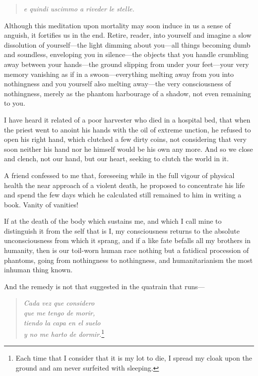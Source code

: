 \begin{quote} \textit{e quindi uscimmo a riveder le stelle.}
\end{quote}

Although this meditation upon mortality may soon induce in us a sense
of anguish, it fortifies us in the end. Retire, reader, into yourself
and imagine a slow dissolution of your\-self---the light dimming about
you---all things becoming dumb and soundless, enveloping you in
silence---the objects that you handle crumbling away between your
hands---the ground slipping from under your feet---your very memory
vanishing as if in a swoon---eve\-ry\-thing melting away from you into
nothingness and you yourself also melting a\-way---the very
consciousness of nothingness, merely as the phantom harbourage of a
shadow, not even remaining to you.

I have heard it related of a poor harvester who died in a hospital
bed, that when the priest went to anoint his hands with the oil of
extreme unction, he refused to open his right hand, which clutched a
few dirty coins, not considering that very soon neither his hand nor
he himself would be his own any more. And so we close and clench, not
our hand, but our heart, seeking to clutch the world in it.

A friend confessed to me that, foreseeing while in the full vigour of
physical health the near approach of a violent death, he proposed to
concentrate his life and spend the few days which he calculated still
remained to him in writing a book. Vanity of vanities!

If at the death of the body which sustains me, and which I call mine
to distinguish it from the self that is I, my consciousness returns to
the absolute unconsciousness from which it sprang, and if a like fate
befalls all my brothers in humanity, then is our toil-worn human race
nothing but a fatidical procession of phantoms, going from nothingness
to nothingness, and humanitarianism the most inhuman thing known.

And the remedy is not that suggested in the quatrain that
runs---

\begin{verse}
\textit{Cada vez que considero\\
que me tengo de morir,\\
tiendo la capa en el suelo\\
y no me harto de dormir.}\footnote{Each time that I
consider that it is my lot to die, I spread my cloak upon the ground
and am never surfeited with sleeping.}
\end{verse}

